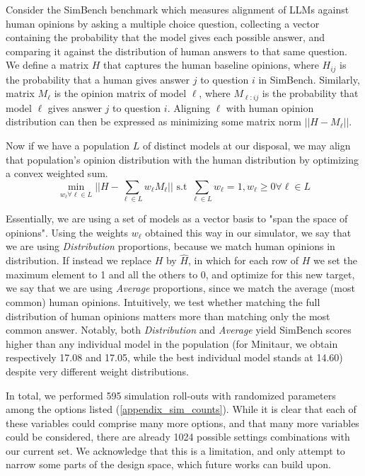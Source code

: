 \documentclass{article} %
\begin{document}
Consider the SimBench  benchmark \citep{hu2025simbenchbenchmarkingabilitylarge} which measures alignment of LLMs against human opinions by asking a multiple choice question, collecting a vector containing the probability that the model gives each possible answer, and comparing it against the distribution of human answers to that same question. We define a matrix $H$ that captures the human baseline opinions, where $H_{ij}$ is the probability that a human gives answer $j$ to question $i$ in SimBench. Similarly, matrix $M_\ell$ is the opinion matrix of model $\ell$, where $M_{\ell:ij}$ is the probability that model $\ell$ gives answer $j$ to question $i$. Aligning $\ell$ with human opinion distribution can then be expressed as minimizing some matrix norm $||H-M_\ell||$.

Now if we have a population $L$ of distinct models at our disposal, we may align that population's opinion distribution with the human distribution by optimizing a convex weighted sum.
$$\min_{w_\ell\forall\ell\in L}||H-\sum_{\ell\in L}w_\ell M_\ell|| \text{ s.t } \sum_{\ell\in L}w_\ell = 1, w_\ell\geq0\forall\ell\in L$$

Essentially, we are using a set of models as a vector basis to "span the space of opinions". Using the weights $w_\ell$ obtained this way in our simulator, we say that we are using \textit{Distribution} proportions, because we match human opinions in distribution. If instead we replace $H$ by $\hat{H}$, in which for each row of $H$ we set the maximum element to 1 and all the others to 0, and optimize for this new target, we say that we are using \textit{Average} proportions, since we match the average (most common) human opinions. Intuitively, we test whether matching the full distribution of human opinions matters more than matching only the most common answer. Notably, both \textit{Distribution} and \textit{Average} yield SimBench scores higher than any individual model in the population (for Minitaur, we obtain respectively 17.08 and 17.05, while the best individual model stands at 14.60) despite very different weight distributions.

In total, we performed 595 simulation roll-outs with randomized parameters among the options listed (\ref{appendix_sim_counts}). While it is clear that each of these variables could comprise many more options, and that many more variables could be considered, there are already 1024 possible settings combinations with our current set. We acknowledge that this is a limitation, and only attempt to narrow some parts of the design space, which future works can build upon.
\end{document}
